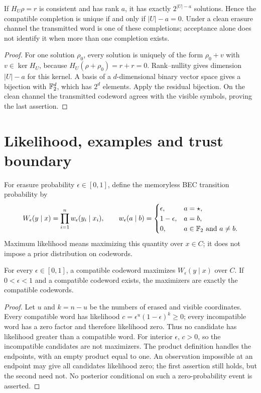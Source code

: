 \begin{prop}\label{prop:core-nullity}
If $H_U\rho=r$ is consistent and has rank $a$, it has exactly
$2^{|U|-a}$ solutions. Hence the compatible completion is unique if
and only if $|U|-a=0$. Under a clean erasure channel the transmitted
word is one of these completions; acceptance alone does not identify
it when more than one completion exists.
\end{prop}
\begin{proof}
For one solution $\rho_0$, every solution is uniquely of the form
$\rho_0+v$ with $v\in\ker H_U$, because
$H_U(\rho+\rho_0)=r+r=0$. Rank--nullity gives dimension $|U|-a$ for
this kernel. A basis of a $d$-dimensional binary vector space gives a
bijection with $\mathbb{F}_2^d$, which has $2^d$ elements. Apply the residual
bijection. On the clean channel the transmitted codeword agrees
with the visible symbols, proving the last assertion.
\end{proof}

\section{Likelihood, examples and trust boundary}\label{sec:interpretation}
For erasure probability $\epsilon\in[0,1]$, define the memoryless BEC
transition probability by
\[
 W_\epsilon(y\mid x)=\prod_{i=1}^n w_\epsilon(y_i\mid x_i),\qquad
 w_\epsilon(a\mid b)=
 \begin{cases}
  \epsilon,&a=\star,\\
  1-\epsilon,&a=b,\\
  0,&a\in\mathbb{F}_2\text{ and }a\ne b.
 \end{cases}
\]
Maximum likelihood means maximizing this quantity over $x\in C$;
it does not impose a prior distribution on codewords.
\begin{prop}\label{prop:core-ml}
For every $\epsilon\in[0,1]$, a compatible codeword maximizes
$W_\epsilon(y\mid x)$ over $C$. If $0<\epsilon<1$ and a compatible
codeword exists, the maximizers are exactly the compatible codewords.
\end{prop}
\begin{proof}
Let $u$ and $k=n-u$ be the numbers of erased and visible coordinates.
Every compatible word has likelihood
$c=\epsilon^u(1-\epsilon)^k\geq0$; every incompatible word has a
zero factor and therefore likelihood zero. Thus no candidate has
likelihood greater than a compatible word. For interior $\epsilon$,
$c>0$, so the incompatible candidates are not maximizers. The product
definition handles the endpoints, with an empty product equal to one.
An observation impossible at an endpoint may give all candidates
likelihood zero; the first assertion still holds, but the second
need not. No posterior conditional on such a zero-probability event
is asserted.
\end{proof}

